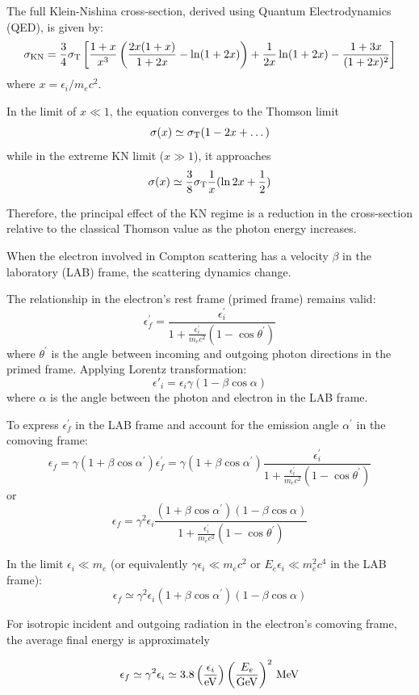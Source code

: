 The full Klein-Nishina cross-section, derived using Quantum Electrodynamics (QED), is given by:
%
\[
\sigma_{\rm KN} = \frac{3}{4} \sigma_{\rm T} \left[ \frac{1+x}{x^3} \left(\frac{2x(1+x)}{1+2x} - \ln (1+2x)\right) + \frac{1}{2x} \ln (1+2x) - \frac{1+3x}{(1+2x)^2} \right]
\]
%
where \( x = \epsilon_i / m_e c^2 \).

In the limit of \( x \ll 1 \), the equation converges to the Thomson limit \[ \sigma(x) \simeq \sigma_{\rm T} (1-2x+\dots) \] while in the extreme KN limit (\( x \gg 1 \)), it approaches \[ \sigma(x) \simeq \frac{3}{8} \sigma_{\rm T} \frac{1}{x} (\ln 2x + \frac{1}{2}) \]

Therefore, the principal effect of the KN regime is a reduction in the cross-section relative to the classical Thomson value as the photon energy increases.


When the electron involved in Compton scattering has a velocity \( \beta \) in the laboratory (LAB) frame, the scattering dynamics change.

The relationship in the electron's rest frame (primed frame) remains valid:
%
\[
\epsilon^\prime_f = \frac{\epsilon^\prime_i}{1+ \frac{\epsilon^\prime_i}{m_e c^2} (1-\cos\theta^\prime)}
\]
%
where \( \theta^\prime \) is the angle between incoming and outgoing photon directions in the primed frame. Applying Lorentz transformation:
%
\[
\epsilon'_i = \epsilon_i \gamma (1-\beta \cos \alpha)
\]
%
where \( \alpha \) is the angle between the photon and electron in the LAB frame.

To express \( \epsilon^\prime_f \) in the LAB frame and account for the emission angle \( \alpha^\prime \) in the comoving frame:
%
\[
\epsilon_f = \gamma(1+\beta \cos\alpha^\prime) \epsilon^\prime_f = 
\gamma (1+\beta \cos \alpha^\prime) \frac{\epsilon^\prime_i}{1+ \frac{\epsilon^\prime_i}{m_e c^2} (1-\cos\theta^\prime)}
\]
%
or
\[
\epsilon_f = \gamma^2 \epsilon_i \frac{(1+\beta \cos\alpha^\prime)(1-\beta \cos\alpha)}{1+ \frac{\epsilon^\prime_i}{m_e c^2} (1-\cos\theta^\prime)}
\]

In the limit \( \epsilon_i \ll m_e \) (or equivalently \( \gamma \epsilon_i \ll m_e c^2 \) or \( E_e \epsilon_i \ll m_e^2 c^4 \) in the LAB frame):
%
\[
\epsilon_f \simeq \gamma^2 \epsilon_i (1+\beta \cos\alpha^\prime)(1-\beta \cos\alpha)
\]

For isotropic incident and outgoing radiation in the electron's comoving frame, the average final energy is approximately 
%
\begin{remark}
\[
 \epsilon_f \simeq \gamma^2 \epsilon_i \simeq 3.8 \left(\frac{\epsilon_i}{\rm eV}\right)\left(\frac{E_e}{\rm GeV}\right)^2 \, \text{MeV}   
\]
\end{remark}

